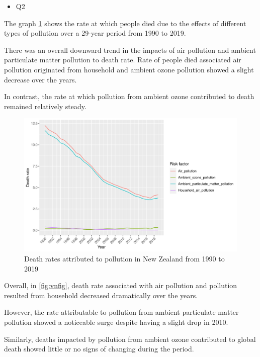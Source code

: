 \documentclass[11pt,a4paper,]{article}
\providecommand{\tightlist}{%
  \setlength{\itemsep}{0pt}\setlength{\parskip}{0pt}}
\begin{document}
\begin{itemize}
\tightlist
\item
  Q2
\end{itemize}

The graph \ref{fig:nzfig} shows the rate at which people died due to the effects of different types of pollution over a 29-year period from 1990 to 2019.

There was an overall downward trend in the impacts of air pollution and ambient particulate matter pollution to death rate.
Rate of people died associated air pollution originated from household and ambient ozone pollution showed a slight decrease over the years.

In contrast, the rate at which pollution from ambient ozone contributed to death remained relatively steady.

\begin{figure}[H]

{\centering \includegraphics[width=0.7\linewidth]{Assignment4_files/figure-latex/nzfig-1} 

}

\caption{Death rates attributed to pollution in New Zealand from 1990 to 2019}\label{fig:nzfig}
\end{figure}

Overall, in \ref{fig:vnfig}, death rate associated with air pollution and pollution resulted from household decreased dramatically over the years.

However, the rate attributable to pollution from ambient particulate matter pollution showed a noticeable surge despite having a slight drop in 2010.

Similarly, deaths impacted by pollution from ambient ozone contributed to global death showed little or no signs of changing during the period.
\end{document}
